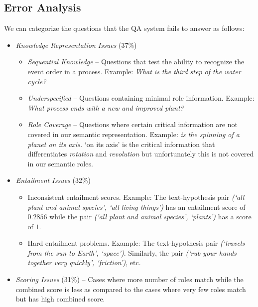 \subsection{Error Analysis}

We can categorize the questions that the QA system fails to answer as follows:
\begin{itemize}
\item {\em Knowledge Representation Issues} (37\%)
\begin{itemize}
\item {\em Sequential Knowledge} -- Questions that test the ability to recognize the event order in a process. Example:  {\em What is the third step of the water cycle?}
\item {\em Underspecified} -- Questions containing minimal role information. Example:  {\em What process ends with a new and improved plant?}
\item {\em Role Coverage} -- Questions where certain critical information are not covered in our semantic representation. Example: {\em \underline{\hspace{1cm}} is the spinning of a planet on its axis.} `on its axis' is the critical information that differentiates {\em rotation} and {\em revolution} but unfortunately this is not covered in our semantic roles.
\end{itemize}
\item {\em Entailment Issues} (32\%)
\begin{itemize}
\item Inconsistent entailment scores. Example: The text-hypothesis pair {\em(`all plant and animal species', `all living things')} has an entailment score of $0.2856$ while the pair {\em(`all plant and animal species', `plants')} has a score of $1$.
\item Hard entailment problems. Example: The text-hypothesis pair {\em(`travels from the sun to Earth', `space')}. Similarly, the pair {\em(`rub your hands together very quickly', `friction')}, etc.
\end{itemize}
\item {\em Scoring Issues} (31\%) -- Cases where more number of roles match while the combined score is less as compared to the cases where very few roles match but has high combined score.
\end{itemize}